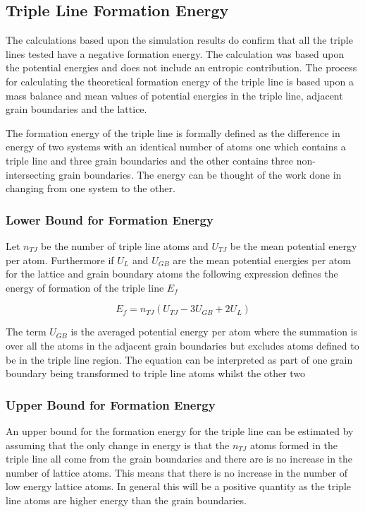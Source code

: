 \documentclass[12pt,a4paper]{book}
\begin{document}
\subsection{Triple Line Formation Energy}

The calculations based upon the simulation results do confirm that all the triple lines tested have a negative formation energy. The calculation was based upon the potential energies and does not include an entropic contribution. The process for calculating the theoretical formation energy of the triple line is based upon a mass balance and mean values of potential energies in the triple line, adjacent grain boundaries and the lattice.

The formation energy of the triple line is formally defined as the difference in energy of two systems with an identical number of atoms one which contains a triple line and three grain boundaries and the other contains three non-intersecting grain boundaries. The energy can be thought of the work done in changing from one system to the other.

\subsubsection{Lower Bound for Formation Energy}

Let $n_{TJ}$ be the number of triple line atoms and $U_{TJ}$ be the mean potential energy per atom. Furthermore if $U_{L}$ and $U_{GB}$ are the mean potential energies per atom for the lattice and grain boundary atoms the following expression defines the energy of formation of the triple line $E_{f}$

\[ E_{f} = n_{TJ}\left(U_{TJ} -3U_{GB} + 2U_{L} \right) \]

The term $U_{GB}$ is the averaged potential energy per atom where the summation is over all the atoms in the adjacent grain boundaries but excludes atoms defined to be in the triple line region. The equation can be interpreted as part of one grain boundary being transformed to triple line atoms whilst the other two     

\subsubsection{Upper Bound for Formation Energy}

An upper bound for the formation energy for the triple line can be estimated by assuming that the only change in energy is that the  $n_{TJ}$ atoms formed in the triple line all come from the grain boundaries and there are is no increase in the number of lattice atoms. This means that there is no increase in the number of low energy lattice atoms. In general this will be a positive quantity as the triple line atoms are higher energy than the grain boundaries. 
\end{document}
